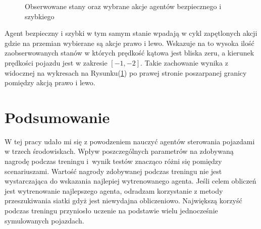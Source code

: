 \documentclass[12pt, oneside]{article}
\begin{document}
\begin{figure}[h]
    \caption{Obserwowane stany oraz wybrane akcje agentów bezpiecznego i szybkiego}
        \label{cykliczneakcje}

\end{figure}
Agent bezpieczny i szybki w tym samym stanie wpadają w cykl zapętlonych akcji gdzie na przemian wybierane są akcje prawo i lewo. Wskazuje na to wysoka ilość zaobserwowanych stanów w których prędkość kątowa jest bliska zeru, a kierunek prędkości pojazdu jest w zakresie $[-1,-2]$. Takie zachowanie wynika z widocznej na wykresach na Rysunku(\ref{cykliczneakcje}) po prawej stronie poszarpanej granicy pomiędzy akcją prawo i lewo.
\section{Podsumowanie}
W tej pracy udało mi się z powodzeniem nauczyć agentów sterowania pojazdami w trzech środowiskach. Wpływ poszczególnych parametrów na zdobywaną nagrodę podczas treningu i~wynik testów znacząco różni się pomiędzy scenariuszami. Wartość nagrody zdobywanej podczas treningu nie jest wystarczająca do wskazania najlepiej wytrenowanego agenta. Jeśli celem obliczeń jest wytrenowanie najlepszego agenta, odradzam korzystanie z metody przeszukiwania siatki gdyż jest niewydajna obliczeniowo. Największą korzyść podczas treningu przyniosło uczenie na podstawie wielu jednocześnie symulowanych pojazdach.

 

\listoffigures
\listoftables
\end{document}
